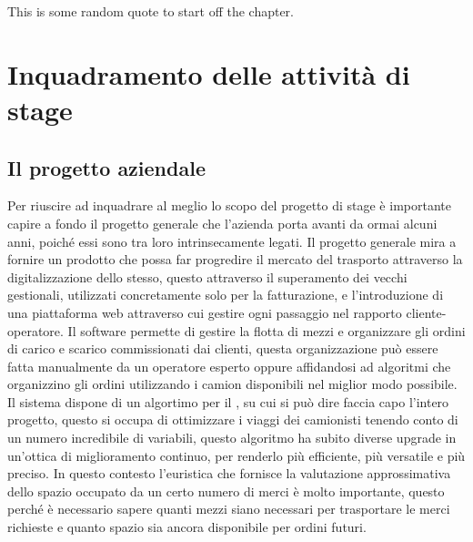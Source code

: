\begin{savequote}[75mm]
	This is some random quote to start off the chapter.
\end{savequote}

\hypertarget{(chap:inquadramento)}{}
\chapter{Inquadramento delle attività di stage}

\section{Il progetto aziendale}
Per riuscire ad inquadrare al meglio lo scopo del progetto di stage è importante capire a fondo il progetto generale che l'azienda porta avanti da ormai alcuni anni, poiché essi sono tra loro intrinsecamente legati. Il progetto generale mira a fornire un prodotto che possa far progredire il mercato del trasporto attraverso la digitalizzazione dello stesso, questo attraverso il superamento dei vecchi gestionali, utilizzati concretamente solo per la fatturazione, e l'introduzione di una piattaforma web attraverso cui gestire ogni passaggio nel rapporto cliente-operatore.
Il software permette di gestire la flotta di mezzi e organizzare gli ordini di carico e scarico commissionati dai clienti, questa organizzazione può essere fatta manualmente da un operatore esperto oppure affidandosi ad algoritmi che organizzino gli ordini utilizzando i camion disponibili nel miglior modo possibile. Il sistema dispone di un algortimo per il , su cui si può dire faccia capo l'intero progetto, questo si occupa di ottimizzare i viaggi dei camionisti tenendo conto di un numero incredibile di variabili, questo algoritmo ha subito diverse upgrade in un'ottica di miglioramento continuo, per renderlo più efficiente, più versatile e più preciso.
In questo contesto l'euristica che fornisce la valutazione approssimativa dello spazio occupato da un certo numero di merci è molto importante, questo perché è necessario sapere quanti mezzi siano necessari per trasportare le merci richieste e quanto spazio sia ancora disponibile per ordini futuri.

